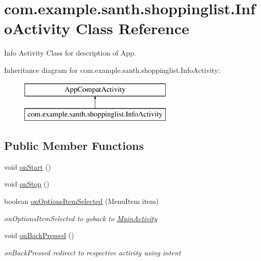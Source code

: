 \hypertarget{classcom_1_1example_1_1santh_1_1shoppinglist_1_1_info_activity}{}\section{com.\+example.\+santh.\+shoppinglist.\+Info\+Activity Class Reference}
\label{classcom_1_1example_1_1santh_1_1shoppinglist_1_1_info_activity}


Info Activity Class for description of App.  


Inheritance diagram for com.\+example.\+santh.\+shoppinglist.\+Info\+Activity\+:\begin{figure}[H]
\begin{center}
\leavevmode
\includegraphics[height=2.000000cm]{classcom_1_1example_1_1santh_1_1shoppinglist_1_1_info_activity}
\end{center}
\end{figure}
\subsection*{Public Member Functions}
\begin{DoxyCompactItemize}
\item 
void \hyperlink{classcom_1_1example_1_1santh_1_1shoppinglist_1_1_info_activity_a17c7856d77bef5e3dc6ac5b71277e7be}{on\+Start} ()
\item 
void \hyperlink{classcom_1_1example_1_1santh_1_1shoppinglist_1_1_info_activity_a42122c7e17c3ba2e5676caed33110458}{on\+Stop} ()
\item 
boolean \hyperlink{classcom_1_1example_1_1santh_1_1shoppinglist_1_1_info_activity_a9e90836addabcf2d0ecd618cd5d425d2}{on\+Options\+Item\+Selected} (Menu\+Item item)
\begin{DoxyCompactList}\small\item\em on\+Options\+Item\+Selected to goback to \hyperlink{classcom_1_1example_1_1santh_1_1shoppinglist_1_1_main_activity}{Main\+Activity} \end{DoxyCompactList}\item 
void \hyperlink{classcom_1_1example_1_1santh_1_1shoppinglist_1_1_info_activity_ace2ec207701b823bdbf9af037cddcfdc}{on\+Back\+Pressed} ()
\begin{DoxyCompactList}\small\item\em on\+Back\+Pressed redirect to respective activity using intent \end{DoxyCompactList}\end{DoxyCompactItemize}
